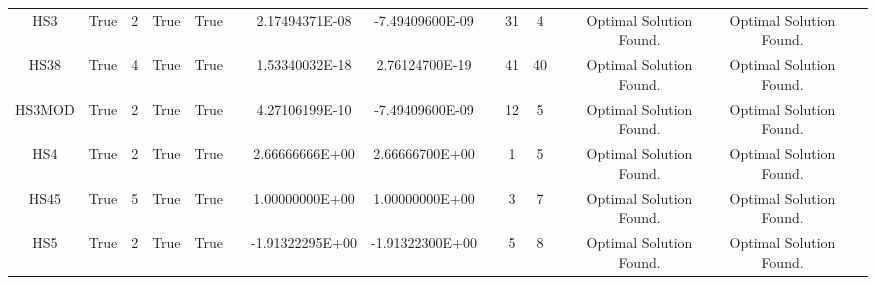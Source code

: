 \begin{longtable}{ccccccccccccccc}
	\cellcolor{default2} HS3& \cellcolor{default2} True& \cellcolor{default2} 2& \cellcolor{default2} True& \cellcolor{default2} True& \cellcolor{header} & \cellcolor{ok} 2.17494371E-08& \cellcolor{best} -7.49409600E-09& \cellcolor{header} & \cellcolor{poor} 31& \cellcolor{best} 4& \cellcolor{header} & \cellcolor{default2} Optimal Solution Found.& \cellcolor{default2} Optimal Solution Found.& \cellcolor{header} \\
	\cellcolor{default1} HS38& \cellcolor{default1} True& \cellcolor{default1} 4& \cellcolor{default1} True& \cellcolor{default1} True& \cellcolor{header} & \cellcolor{ok} 1.53340032E-18& \cellcolor{best} 2.76124700E-19& \cellcolor{header} & \cellcolor{ok} 41& \cellcolor{best} 40& \cellcolor{header} & \cellcolor{default1} Optimal Solution Found.& \cellcolor{default1} Optimal Solution Found.& \cellcolor{header} \\
	\cellcolor{default2} HS3MOD& \cellcolor{default2} True& \cellcolor{default2} 2& \cellcolor{default2} True& \cellcolor{default2} True& \cellcolor{header} & \cellcolor{ok} 4.27106199E-10& \cellcolor{best} -7.49409600E-09& \cellcolor{header} & \cellcolor{poor} 12& \cellcolor{best} 5& \cellcolor{header} & \cellcolor{default2} Optimal Solution Found.& \cellcolor{default2} Optimal Solution Found.& \cellcolor{header} \\
	\cellcolor{default1} HS4& \cellcolor{default1} True& \cellcolor{default1} 2& \cellcolor{default1} True& \cellcolor{default1} True& \cellcolor{header} & \cellcolor{best} 2.66666666E+00& \cellcolor{ok} 2.66666700E+00& \cellcolor{header} & \cellcolor{best} 1& \cellcolor{poor} 5& \cellcolor{header} & \cellcolor{default1} Optimal Solution Found.& \cellcolor{default1} Optimal Solution Found.& \cellcolor{header} \\
	\cellcolor{default2} HS45& \cellcolor{default2} True& \cellcolor{default2} 5& \cellcolor{default2} True& \cellcolor{default2} True& \cellcolor{header} & \cellcolor{ok} 1.00000000E+00& \cellcolor{best} 1.00000000E+00& \cellcolor{header} & \cellcolor{best} 3& \cellcolor{poor} 7& \cellcolor{header} & \cellcolor{default2} Optimal Solution Found.& \cellcolor{default2} Optimal Solution Found.& \cellcolor{header} \\
	\cellcolor{default1} HS5& \cellcolor{default1} True& \cellcolor{default1} 2& \cellcolor{default1} True& \cellcolor{default1} True& \cellcolor{header} & \cellcolor{ok} -1.91322295E+00& \cellcolor{best} -1.91322300E+00& \cellcolor{header} & \cellcolor{best} 5& \cellcolor{ok} 8& \cellcolor{header} & \cellcolor{default1} Optimal Solution Found.& \cellcolor{default1} Optimal Solution Found.& \cellcolor{header} \\

\end{longtable}
